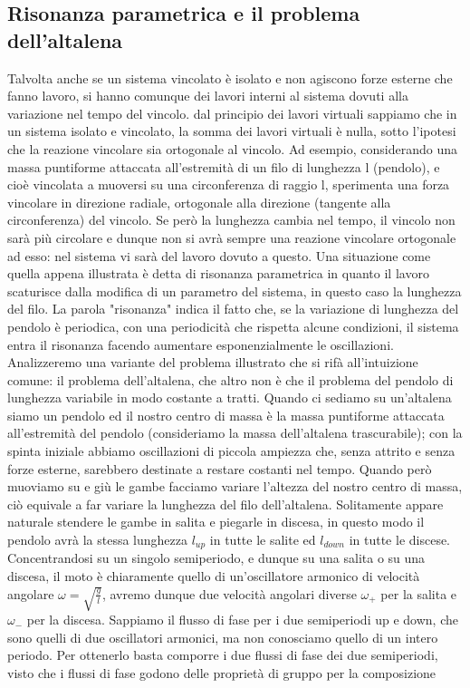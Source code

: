 \documentclass[
10pt, %
a4paper, %
oneside, %
headinclude,footinclude, %
BCOR5mm, %
]{scrartcl}
\begin{document}
\subsection{Risonanza parametrica e il problema dell'altalena}
Talvolta anche se un sistema vincolato è isolato e non agiscono forze esterne che fanno lavoro, si hanno comunque dei lavori interni al sistema dovuti alla variazione nel tempo del vincolo. dal principio dei lavori virtuali sappiamo che in un sistema isolato e vincolato, la somma dei lavori virtuali è nulla, sotto l'ipotesi che la reazione vincolare sia ortogonale al vincolo. Ad esempio, considerando una massa puntiforme attaccata all'estremità di un filo di lunghezza l (pendolo), e cioè vincolata a muoversi su una circonferenza di raggio l, sperimenta una forza vincolare in direzione radiale, ortogonale alla direzione (tangente alla circonferenza) del vincolo. Se però la lunghezza cambia nel tempo, il vincolo non sarà più circolare e dunque non si avrà sempre una reazione vincolare ortogonale ad esso: nel sistema vi sarà del lavoro dovuto a questo. Una situazione come quella appena illustrata è detta di risonanza parametrica in quanto il lavoro scaturisce dalla modifica di un parametro del sistema, in questo caso la lunghezza del filo. La parola "risonanza" indica il fatto che, se la variazione di lunghezza del pendolo è periodica, con una periodicità che rispetta alcune condizioni, il sistema entra il risonanza facendo aumentare esponenzialmente le oscillazioni. Analizzeremo una variante del problema illustrato che si rifà all'intuizione comune: il problema dell'altalena, che altro non è che il problema del pendolo di lunghezza variabile in modo costante a tratti. Quando ci sediamo su un'altalena siamo un pendolo ed il nostro centro di massa è la massa puntiforme attaccata all'estremità del pendolo (consideriamo la massa dell'altalena trascurabile); con la spinta iniziale abbiamo oscillazioni di piccola ampiezza che, senza attrito e senza forze esterne, sarebbero destinate a restare costanti nel tempo. Quando però muoviamo su e giù le gambe facciamo variare l'altezza del nostro centro di massa, ciò equivale a far variare la lunghezza del filo dell'altalena. Solitamente appare naturale stendere le gambe in salita e piegarle in discesa, in questo modo il pendolo avrà la stessa lunghezza \(l_{up}\) in tutte le salite ed \(l_{down}\) in tutte le discese. Concentrandosi su un singolo semiperiodo, e dunque su una salita o su una discesa, il moto è chiaramente quello di un'oscillatore armonico di velocità angolare \(\omega = \sqrt{\frac{g}{l}}\), avremo dunque due velocità angolari diverse $\omega_+$ per la salita e \(\omega_-\) per la discesa. Sappiamo il flusso di fase per i due semiperiodi up e down, che sono quelli di due oscillatori armonici, ma non conosciamo quello di un intero periodo. Per ottenerlo basta comporre i due flussi di fase dei due semiperiodi, visto che i flussi di fase godono delle proprietà di gruppo per la composizione
\end{document}
